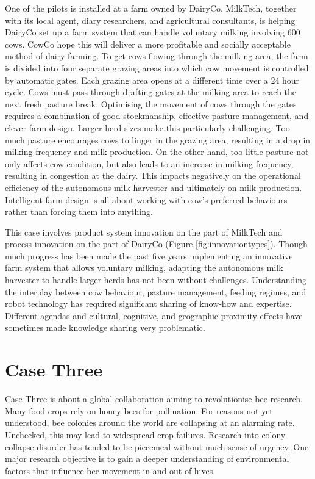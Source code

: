 One of the pilots is installed at a farm owned by DairyCo. MilkTech, together with its local agent, diary researchers, and agricultural consultants, is helping DairyCo set up a farm system that can handle voluntary milking involving 600 cows.  CowCo hope this will deliver a more profitable and socially acceptable method of dairy farming. To get cows flowing through the milking area, the farm is divided into four separate grazing areas into which cow movement is controlled by automatic gates. Each grazing area opens at a different time over a 24 hour cycle. Cows must pass through drafting gates at the milking area to reach the next fresh pasture break. Optimising the movement of cows through the gates requires a combination of good stockmanship, effective pasture management, and clever farm design. Larger herd sizes make this particularly challenging. Too much pasture encourages cows to linger in the grazing area, resulting in a drop in milking frequency and milk production. On the other hand, too little pasture not only affects cow condition, but also leads to an increase in milking frequency, resulting in congestion at the dairy. This impacts negatively on the operational efficiency of the autonomous milk harvester and ultimately on milk production. Intelligent farm design is all about working with cow's preferred behaviours rather than forcing them into anything. \medskip

This case involves product system innovation on the part of MilkTech and process innovation on the part of DairyCo (Figure \ref{fig:innovationtypes}). Though much progress has been made the past five years implementing an innovative farm system that allows voluntary milking, adapting the autonomous milk harvester to handle larger herds has not been without challenges. Understanding the interplay between cow behaviour, pasture management, feeding regimes, and robot technology has required significant sharing of know-how and expertise. Different agendas and cultural, cognitive, and geographic proximity effects have sometimes made knowledge sharing very problematic. \medskip

\section{Case Three}

Case Three is about a global collaboration aiming to revolutionise bee research. Many food crops rely on honey bees for pollination. For reasons not yet understood, bee colonies around the world are collapsing at an alarming rate. Unchecked, this may lead to widespread crop failures. Research into colony collapse disorder has tended to be piecemeal without much sense of urgency. One major research objective is to gain a deeper understanding of environmental factors that influence bee movement in and out of hives. \medskip

